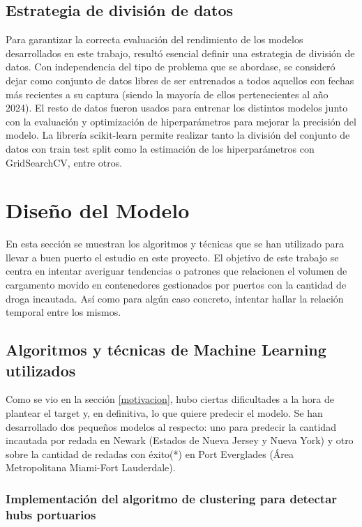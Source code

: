 \documentclass[12pt]{article}
\begin{document}
	\subsection{Estrategia de división de datos}
	Para garantizar la correcta evaluación del rendimiento de los modelos desarrollados en este trabajo, resultó esencial definir una estrategia de división de datos. Con independencia del tipo de problema que se abordase, se consideró dejar como conjunto de datos libres de ser entrenados a todos aquellos con fechas más recientes a su captura (siendo la mayoría de ellos pertenecientes al año 2024). El resto de datos fueron usados para entrenar los distintos modelos junto con la evaluación y optimización de hiperparámetros para mejorar la precisión del modelo. La librería scikit-learn permite realizar tanto la división del conjunto de datos con train test split como la estimación de los hiperparámetros con GridSearchCV, entre otros.

\newpage
\section{\label{Diseño}Diseño del Modelo}
En esta sección se muestran los algoritmos y técnicas que se han utilizado para llevar a buen puerto el estudio en este proyecto. El objetivo de este trabajo se centra en intentar averiguar tendencias o patrones que relacionen el volumen de cargamento movido en contenedores gestionados por puertos con la cantidad de droga incautada. Así como para algún caso concreto, intentar hallar la relación temporal entre los mismos.

	\subsection{Algoritmos y técnicas de Machine Learning utilizados}

	
	Como se vio en la sección \ref{motivacion}, hubo ciertas dificultades a la hora de plantear el target y, en definitiva, lo que quiere predecir el modelo. Se han desarrollado dos pequeños modelos al respecto: uno para predecir la cantidad incautada por redada en Newark (Estados de Nueva Jersey y Nueva York) y otro sobre la cantidad de redadas con éxito(*) en Port Everglades (Área Metropolitana Miami-Fort Lauderdale).
	
	\subsubsection{Implementación del algoritmo de clustering para detectar hubs portuarios}
	
\end{document}
